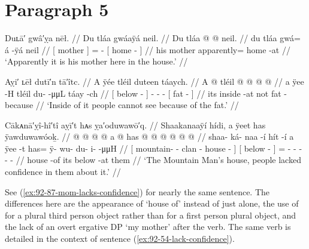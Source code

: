 \section{Paragraph 5}\label{sec:92-para-5}

\ex\label{ex:92-112-his-mother-at-home}%
%
\begingl
	\glpreamble	Duʟā′ gwâ′ỵa nēł. //
	\glpreamble	Du tláa gwáaÿá neil. //
	\gla	{} Du tláa {}  @ {} @ {}
		{} neil. {} {} //
	\glb	{} du tláa {} gwá= á -ÿá
		{} neil {} {} //
	\glc	{}[  mother {}] =  -
		{}[ home - {}] //
	\gld	{} his mother {} apparently=  {}
		{} home -at {} //
	\glft	‘Apparently it is his mother here in the house.’
		//
\endgl
\xe

\ex\label{ex:92-113-inside-cant-see-because-fat}%
%
\begingl
	\glpreamble	Aỵi′ ʟēł dutī′n tā′îtc. //
	\glpreamble	A ÿée tléil duteen táaych. //
	\gla	{} A  @ {} {}
		tléil  @ {} @ {} @ {}
		{}  @ {} {} //
	\glb	{} a ÿee -H {}
		tléil {} du-  -μμL
		{} táay -ch {} //
	\glc	{}[  below - {}]
		 - -  -
		{}[ fat - {}] //
	\gld	{} its inside -at {}
		not  {} {} {}
		{} fat -because {} //
	\glft	‘Inside of it people cannot see because of the fat.’
		//
\endgl
\xe

\ex\label{ex:92-114-lacked-confidence}%
%
\begingl
	\glpreamble	Cākᴀnā′ỵî-hî′tî aỵī′t hᴀs ỵa′oduwawō′q. //
	\glpreamble	Shaakanaaÿí hídi, a ÿeet has ÿawduwawóoḵ. //
	\gla	{}  @ {} @ {} @ {}  @ {} {}
		{} a  @ {} {}
		has @  @ {} @ {} @ {} @ {} @ {} //
	\glb	{} shaa- ká- naa -í hít -í {}
		{} a ÿee -t {}
		has= ÿ- wu- du- i-  -μμH  //
	\glc	{}[ mountain- - clan - house - {}]
		{}[  below - {}]
		= - - - -
			 - //
	\gld	{}  {} {} {} house -of {}
		{} its below -at {}
		them  {} {} {} {} {} //
	\glft	‘The Mountain Man’s house, people lacked confidence in them about it.’
		//
\endgl
\xe

See (\ref{ex:92-87-mom-lacks-confidence}) for nearly the same sentence.
The differences here are the appearance of  ‘house of’ instead of just  alone, the use of  for a plural third person object rather than  for a first person plural object, and the lack of an overt ergative DP  ‘my mother’ after the verb.
The same verb is detailed in the context of sentence (\ref{ex:92-54-lack-confidence}).

